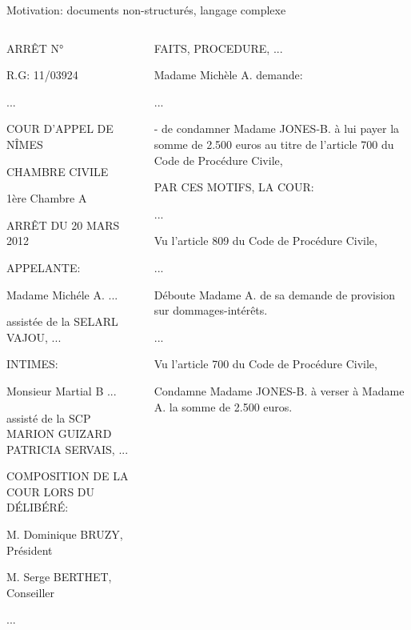 \documentclass[newPxFont,pagenumber]{beamer}
\begin{document}
\begin{frame}{Motivation: documents non-structurés, langage complexe}
	\scriptsize
	\begin{columns}
		\begin{column}{.50\linewidth}
			ARRÊT N°
			
			R.G: 11/03924
			
			...
			
			{COUR D'APPEL} DE {NÎMES}
			
			{CHAMBRE CIVILE}
			
			{1ère Chambre A}
			
			ARRÊT DU {20 MARS 2012}
			
			APPELANTE:
			
			{Madame Michéle A.} ...
			
			assistée de la {SELARL VAJOU}, ...
			
			INTIMES:
			
			{Monsieur Martial B} ...
			
			assisté de la {SCP MARION GUIZARD PATRICIA SERVAIS}, ...
			
			COMPOSITION DE LA COUR LORS DU DÉLIBÉRÉ:
			
			{M. Dominique BRUZY, Président}
			
			{M. Serge BERTHET, Conseiller}
			
			...
		\end{column}
		\begin{column}{.50\linewidth}
			FAITS, PROCEDURE, ...
			
			Madame Michèle A. demande:
			
			...
			
			- de condamner Madame JONES-B. à lui payer la somme de {2.500 euros} au titre de l'{article 700 du Code de Procédure Civile}, 
			
			\vspace{0.4cm}
			
			PAR CES MOTIFS, LA COUR:
			
			...
			
			Vu l'{article 809 du Code de Procédure Civile},
			
			...
			
			{Déboute Madame A. de sa demande de provision sur dommages-intérêts.}
			
			...
			
			Vu l'{article 700 du Code de Procédure Civile},
			
			Condamne Madame JONES-B. à verser à Madame A. la somme de {2.500 euros}.
		\end{column}
	\end{columns}
\end{frame}
\end{document}
